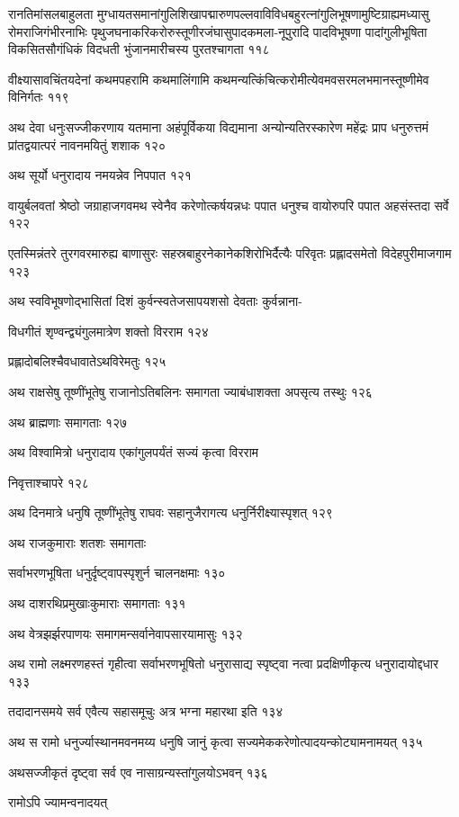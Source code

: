 रानतिमांसलबाहुलता
मुग्धायतसमानांगुलिशिखापद्मारुणपल्लवाविविधबहुरत्नांगुलिभूषणामुष्टिग्राह्यमध्यासु
रोमराजिगंभीरनाभिः पृथुजघनाकरिकरोरुस्तूणीरजंघासुपादकमला-नूपुरादि पादविभूषणा
पादांगुलीभूषिता विकसितसौगंधिकं विदधती भुंजानमारीचस्य पुरतश्चागता ११८

वीक्ष्यासावचिंतयदेनां कथमपहरामि कथमालिंगामि
कथमन्यत्किंचित्करोमीत्येवमवसरमलभमानस्तूष्णीमेव विनिर्गतः ११९

अथ देवा धनुःसज्जीकरणाय यतमाना अहंपूर्विकया विद्यमाना अन्योन्यतिरस्कारेण महेंद्रः प्राप
धनुरुत्तमं प्रांतद्वयात्परं नावनमयितुं शशाक १२०

अथ सूर्यो धनुरादाय नमयन्नेव निपपात १२१

वायुर्बलवतां श्रेष्ठो जग्राहाजगवमथ स्वेनैव करेणोत्कर्षयन्नधः पपात धनुश्च वायोरुपरि पपात
अहसंस्तदा सर्वे १२२

एतस्मिन्नंतरे तुरगवरमारुह्य बाणासुरः सहस्रबाहुरनेकानेकशिरोभिर्दैत्यैः परिवृतः प्रह्लादसमेतो
विदेहपुरीमाजगाम १२३

अथ स्वविभूषणोद्भासितां दिशं कुर्वन्स्वतेजसापयशसो देवताः कुर्वन्नाना-

विधगीतं शृण्वन्द्व्यंगुलमात्रेण शक्तो विरराम १२४

प्रह्लादोबलिश्चैवधावातेऽथविरेमतुः १२५

अथ राक्षसेषु तूष्णींभूतेषु राजानोऽतिबलिनः समागता ज्याबंधाशक्ता अपसृत्य तस्थुः १२६

अथ ब्राह्मणाः समागताः १२७

अथ विश्वामित्रो धनुरादाय एकांगुलपर्यंतं सज्यं कृत्वा विरराम

निवृत्ताश्चापरे १२८

अथ दिनमात्रे धनुषि तूष्णींभूतेषु राघवः सहानुजैरागत्य धनुर्निरीक्ष्यास्पृशत् १२९

अथ राजकुमाराः शतशः समागताः

सर्वाभरणभूषिता धनुर्दृष्ट्वापस्पृशुर्न चालनक्षमाः १३०

अथ दाशरथिप्रमुखाःकुमाराः समागताः १३१

अथ वेत्रझर्झरपाणयः समागमन्सर्वानेवापसारयामासुः १३२

अथ रामो लक्ष्मरणहस्तं गृहीत्वा सर्वाभरणभूषितो धनुरासाद्य स्पृष्ट्वा नत्वा प्रदक्षिणीकृत्य
धनुरादायोद्दधार १३३

तदादानसमये सर्व एवैत्य सहासमूचुः अत्र भग्ना महारथा इति १३४

अथ स रामो धनुर्ज्यास्थानमवनमय्य धनुषि जानुं कृत्वा सज्यमेककरेणोत्पादयन्कोट्यामनामयत् १३५

अथसज्जीकृतं दृष्ट्वा सर्व एव नासाग्रन्यस्तांगुलयोऽभवन् १३६

रामोऽपि ज्यामन्वनादयत्

